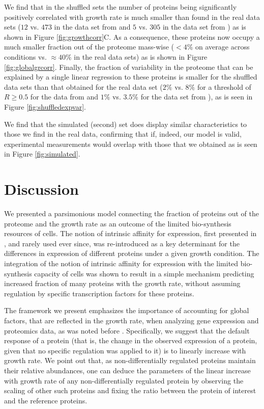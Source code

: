 \documentclass{article}
\newcommand{\hGlobal}{$473$}
\newcommand{\hGlobalShuff}{$12$}
\newcommand{\vnGlobalShuff}{$5$}
\newcommand{\vGlobalShuff}{\vnGlobalShuff{}}
\newcommand{\vnGlobal}{$305$}
\newcommand{\vGlobal}{\vnGlobal{}}
\begin{document}
We find that in the shuffled sets the number of proteins being significantly positively correlated with
growth rate is much smaller than found in the real data sets (\hGlobalShuff{} vs. \hGlobal{} in the data set from \cite{Schmidt2015} and \vGlobalShuff{} vs. \vGlobal{} in the data set from \cite{Peebo_2015}) as is shown in Figure \ref{fig:growthcorr}C.
As a consequence, these proteins now occupy a much smaller fraction out of the proteome mass-wise ($<4\%$ on average across conditions vs. $\approx 40\%$ in the real data sets) as is shown in Figure \ref{fig:globalgrcorr}.
Finally, the fraction of variability in the proteome that can be explained by a single linear regression to these proteins is smaller for the shuffled data sets than that obtained for the real data set ($2\%$ vs. $8\%$ for a threshold of $R\ge0.5$ for the data from \cite{Schmidt2015} and $1\%$ vs. $3.5\%$ for the data set from \cite{Peebo_2015}), as is seen in Figure \ref{fig:shuffledexpvar}.

We find that the simulated (second) set does display similar characteristics to those we find in the real data, confirming that if, indeed, our model is valid, experimental measurements would overlap with those that we obtained as is seen in Figure \ref{fig:simulated}.

\section{Discussion}
We presented a parsimonious model connecting the fraction of proteins out of the proteome and the growth rate as an outcome of the limited bio-synthesis resources of cells. 
The notion of intrinsic affinity for expression, first presented in \cite{Maaloe1969}, and rarely used ever since, was re-introduced as a key determinant for the differences in expression of different proteins under a given growth condition.
The integration of the notion of intrinsic affinity for expression with the limited bio-synthesis capacity of cells was shown to result in a simple mechanism predicting increased fraction of many proteins with the growth rate, without assuming regulation by specific transcription factors for these proteins.

The framework we present emphasizes the importance of accounting for global factors, that are reflected in the growth rate, when analyzing gene expression and proteomics data, as was noted before \cite{Maaloe1969,Brauer2008,Klumpp2009,Klumpp2014,Scott2010,Berthoumieux2013,Keren2013,Gerosa2013,Valgepea2013,Hui_2015,Peebo_2015,Wei_e_2015}.
Specifically, we suggest that the default response of a protein (that is, the change in the observed expression of a protein, given that no specific regulation was applied to it) is to linearly increase with growth rate.
We point out that, as non-differentially regulated proteins maintain their relative abundances, one can deduce the parameters of the linear increase with growth rate of any non-differentially regulated protein by observing the scaling of other such proteins and fixing the ratio between the protein of interest and the reference proteins.
\end{document}
